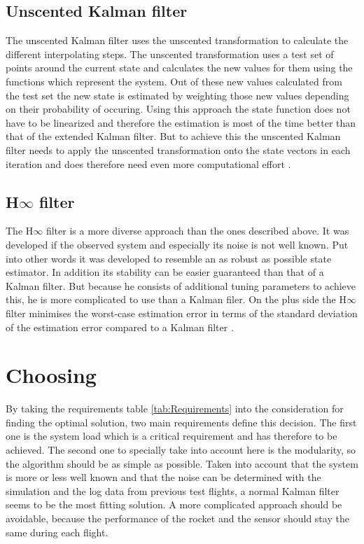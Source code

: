   \subsection{Unscented Kalman filter}
  The unscented Kalman filter uses the unscented transformation to calculate the different interpolating steps.
  The unscented transformation uses a test set of points around the current state and calculates the new values for them using the functions which represent the system.
  Out of these new values calculated from the test set the new state is estimated by weighting those new values depending on their probability of occuring.
  Using this approach the state function does not have to be linearized and therefore the estimation is most of the time better than that of the extended Kalman filter.
  But to achieve this the unscented Kalman filter needs to apply the unscented transformation onto the state vectors in each iteration
  and does therefore need even more computational effort \cite{SimonDan2006Ose:}.

  \subsection{H$\infty$ filter}
  The H$\infty$ filter is a more diverse approach than the ones described above.
  It was developed if the observed system and especially its noise is not well known.
  Put into other words it was developed to resemble an as robust as possible state estimator.
  In addition its stability can be easier guaranteed than that of a Kalman filter.
  But because he consists of additional tuning parameters to achieve this, he is more complicated to use than a Kalman filer.
  On the plus side the H$\infty$ filter minimises the worst-case estimation error in terms of the standard deviation of the estimation error compared to a Kalman filter \cite{SimonDan2006Ose:}.

  \newpage
  \section{Choosing}
  By taking the requirements table \ref{tab:Requirements} into the consideration for finding
  the optimal solution, two main requirements define this decision.
  The first one is the system load which is a critical requirement and has therefore to be achieved.
  The second one to specially take into account here is the modularity, so the algorithm should be as simple as possible.
  Taken into account that the system is more or less well known and that the noise can be
  determined with the simulation and the log data from previous test flights,
  a normal Kalman filter seems to be the most fitting solution.
  A more complicated approach should be avoidable, because the performance of the rocket and the sensor should stay the same during
  each flight.

